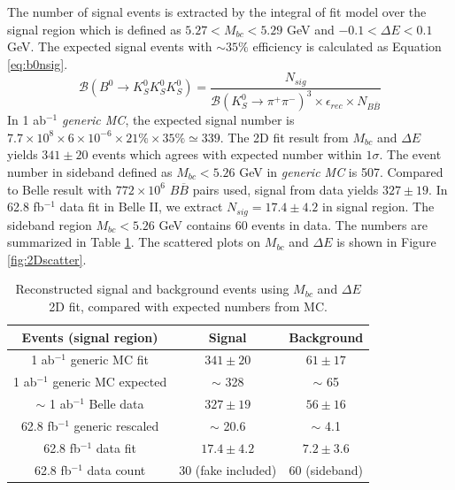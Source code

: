  The number of signal events is extracted by the integral of fit model over the signal region which is defined as $5.27 < M_{bc} < 5.29 $ GeV and $-0.1 < \Delta E < 0.1$ GeV.
 The expected signal events with $\sim 35\%$ efficiency is calculated as Equation \ref{eq:b0nsig}.
 \begin{equation}\label{eq:b0nsig}
 \mathcal{B}(B^0 \to K_S^0  K_S^0  K_S^0)=
 \frac{N_{sig}}{\mathcal{B}(K_S^0\to \pi^+\pi^-)^3\times
 	\epsilon_{rec}\times N_{B\bar{B}}}
 \end{equation}
 In 1 ab$^{-1}$ \textit{generic MC}, the expected signal number is $7.7\times 10^8 \times 6\times 10^{-6} \times 21\% \times 35\% \simeq 339$. The 2D fit result from $M_{bc}$ and $\Delta E$ yields $341\pm 20$ events which agrees with expected number within $1\sigma$. The event number in sideband defined as $M_{bc}<5.26$ GeV in \textit{generic MC} is 507. Compared to Belle result with $772\times 10^6$ $B\overline{B}$ pairs used, signal from data yields $327\pm 19$. In 62.8 fb$^{-1}$ data fit in Belle II, we extract $N_{sig} = 17.4 \pm 4.2$ in signal region. The sideband region $M_{bc}<5.26$ GeV contains 60 events in data. The numbers are summarized in Table \ref{tab:recoB}. The scattered plots on $M_{bc}$ and $\Delta E$ is shown in Figure \ref{fig:2Dscatter}.
 \begin{table}[htpb]
 	\centering 
 	\caption{Reconstructed signal and background events using $M_{bc}$ and $\Delta E$ 2D fit, compared with expected numbers from MC.}
 	\label{tab:recoB}
 	\begin{tabular}{|c|c|c|} 
 		\hline
 		Events (signal region) & Signal &  Background\\
 		\hline
 		1 ab$^{-1}$ generic MC fit & $341\pm 20$ & $61 \pm 17$\\
 		\hline
 		1 ab$^{-1}$ generic MC expected & $\sim$ 328 & $\sim$ 65\\
 		\hline
 		$\sim$ 1 ab$^{-1}$ Belle data &  $327\pm 19$ & $56 \pm 16$\\
 		\hline
 		62.8 fb$^{-1}$ generic rescaled & $\sim$ 20.6 & $\sim$ 4.1\\
 		\hline
 		62.8 fb$^{-1}$ data fit & $17.4\pm 4.2$ & $7.2\pm 3.6$\\
 		\hline
 		62.8 fb$^{-1}$ data count & 30 (fake included) & 60 (sideband)\\
 		
 		\hline
 	\end{tabular}
 \end{table}
 
